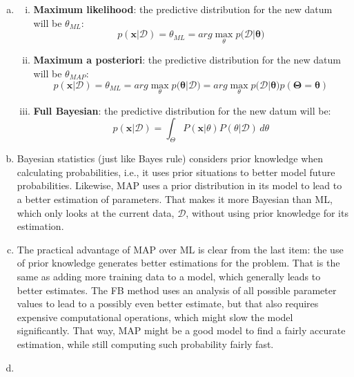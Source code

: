 \documentclass{article}
\begin{document}
\begin{enumerate}[a.]

\item %
\begin{enumerate}[i.]
\item
\textbf{Maximum likelihood}: the predictive distribution for the new datum will be $\theta_{ML}$:
$$p(\bm{x}|\mathcal D)=\theta_{ML}=arg\max_\theta{p(\mathcal D|\bm{\theta}})$$

\item
\textbf{Maximum a posteriori}: the predictive distribution for the new datum will be $\theta_{MAP}$:
$$p(\bm{x}|\mathcal D)=\theta_{ML}=arg\max_\theta{p(\bm{\theta}|\mathcal D})=arg\max_\theta{p(\mathcal D|\bm{\theta}})p(\bm{\Theta}=\bm{\theta})$$

\item
\textbf{Full Bayesian}: the predictive distribution for the new datum will be:
$$p(\bm{x}|\mathcal D)= \int_\Theta P(\bm{x}|\theta)P(\theta | \mathcal{D})\,d\theta$$

\end{enumerate}


\item %

Bayesian statistics (just like Bayes rule) considers prior knowledge when calculating probabilities, i.e., it uses prior situations to better model future probabilities. Likewise, MAP uses a prior distribution in its model to lead to a better estimation of parameters. That makes it more Bayesian than ML, which only looks at the current data, $\mathcal{D}$, without using prior knowledge for its estimation.

\item %

The practical advantage of MAP over ML is clear from the last item: the use of prior knowledge generates better estimations for the problem. That is the same as adding more training data to a model, which generally leads to better estimates. The FB method uses an analysis of all possible parameter values to lead to a possibly even better estimate, but that also requires expensive computational operations, which might slow the model significantly. That way, MAP might be a good model to find a fairly accurate estimation, while still computing such probability fairly fast.

\item %


\end{enumerate}
\end{document}
